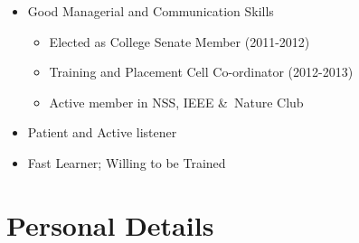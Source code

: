 \documentclass[11pt,a4paper,sans]{moderncv} %
\begin{document}
\cvitem{}
{
\begin{itemize}
	\item Good Managerial and Communication Skills
	\begin{itemize}
		\item Elected as College Senate Member (2011-2012)
		\item Training and Placement Cell Co-ordinator (2012-2013)
		\item Active member in NSS, IEEE \&\  Nature Club
	\end{itemize}
		\item Patient and Active listener
		\item Fast Learner; Willing to be Trained
\end{itemize}
}
\begin{comment}
\section{Languages}

\cvitemwithcomment{English}{Mothertongue}{}
\cvitemwithcomment{Spanish}{Intermediate}{Conversationally fluent}
\cvitemwithcomment{Dutch}{Basic}{Basic words and phrases only}
\end{comment}

\section{\textbf{Personal Details}}
\begin{cvcolumns}

\end{cvcolumns}
\end{document}
